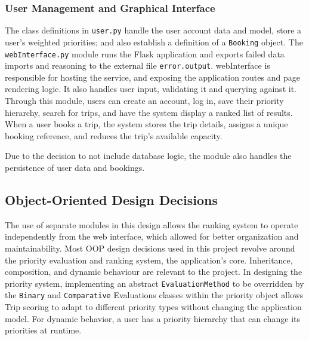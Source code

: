 ﻿\documentclass[11pt]{article}
\begin{document}
\subsubsection{User Management and Graphical Interface}
The class definitions in \texttt{user.py} handle the user account data and model, store a user's weighted priorities; and also establish a definition of a \texttt{Booking} object.
The \texttt{webInterface.py} module runs the Flask application and exports failed data imports and reasoning to the external file \texttt{error.output}.
webInterface is responsible for hosting the service, and exposing the application routes and page rendering logic. It also handles user input, validating it and querying against it.
Through this module, users can create an account, log in, save their priority hierarchy, search for trips, and have the system display a ranked list of results.
When a user books a trip, the system stores the trip details, assigns a unique booking reference, and reduces the trip’s available capacity.

Due to the decision to not include database logic, the module also handles the persistence of user data and bookings.

\subsection{Object-Oriented Design Decisions}
The use of separate modules in this design allows the ranking system to operate independently from the web interface, which allowed for better organization and maintainability.
Most OOP design decisions used in this project revolve around the priority evaluation and ranking system, the application's core.
Inheritance, composition, and dynamic behaviour are relevant to the project. In designing the priority system, implementing an abstract \texttt{EvaluationMethod}
to be overridden by the \texttt{Binary} and \texttt{Comparative} Evaluations classes 
within the priority object allows Trip scoring to adapt to different priority types without changing the application model.
For dynamic behavior, a user has a priority hierarchy that can change its priorities at runtime.

\newpage
\end{document}
